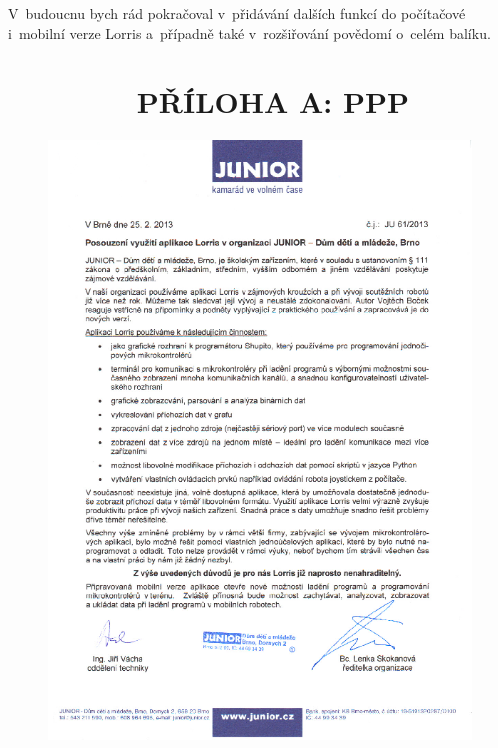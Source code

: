 \documentclass[12pt, a4paper, oneside]{article}
\begin{document}
V~budoucnu bych rád pokračoval v~přidávání dalších funkcí do počítačové i~mobilní verze Lorris a~případně také v~rozšiřování povědomí o~celém balíku.



\newpage
\hoffset=-1in
\voffset=-1in
\topmargin=20pt
\headsep=0pt
\headheight=0pt

\section*{~~~~~~~~PŘÍLOHA A: PPP}
\begin{figure}[H]
\begin{center}
\includegraphics[scale=0.9]{img/junior.png}
\end{center}
\end{figure}
\end{document}
